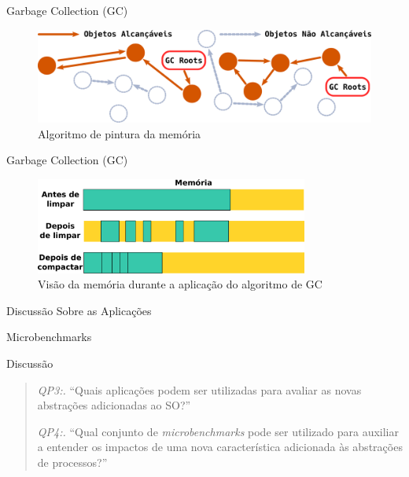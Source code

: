 \documentclass[xcolor={usenames,svgnames,dvipsnames},brazil,english,12pt,aspectratio=149]{beamer}
\begin{document}
\begin{frame}{Garbage Collection (GC)}
	\begin{figure}[!h]
		\centering
		\includegraphics[width=\textwidth]{gc_algoritmo}
		\caption{Algoritmo de pintura da memória}
		\label{fig:gc_alg}
	\end{figure}
\end{frame}

\begin{frame}{Garbage Collection (GC)}
	\begin{figure}[!h]
		\centering
		\includegraphics[width=0.8\textwidth]{gc_memory}
		\caption{Visão da memória durante a aplicação do algoritmo de GC}
		\label{fig:gc_mem}
	\end{figure}
\end{frame}

\begin{frame}{Discussão Sobre as Aplicações}
	
\end{frame}

\begin{frame}{Microbenchmarks}
\end{frame}

\begin{frame}{Discussão}
	\begin{quote}
		\item \emph{QP3:.} ``Quais aplicações podem ser utilizadas para avaliar as novas abstrações adicionadas ao SO?''
		\item \emph{QP4:.} ``Qual conjunto de \emph{microbenchmarks} pode ser utilizado para auxiliar a entender os impactos de uma nova característica adicionada às abstrações de processos?''
	\end{quote}
\end{frame}
\end{document}
